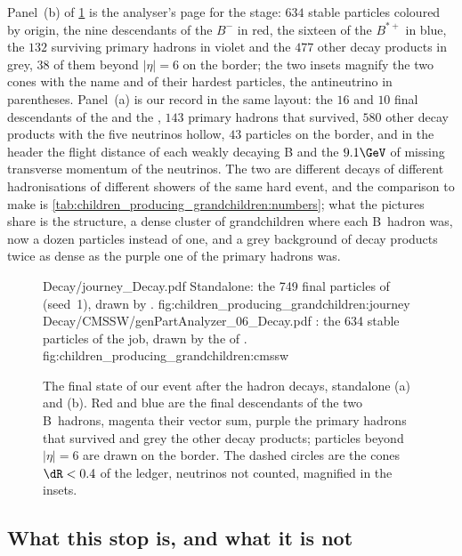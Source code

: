Panel~(b) of \cref{fig:children_producing_grandchildren:displays} is the
analyser's page for the stage: $634$ stable particles coloured by origin,
the nine descendants of the $B^-$ in red, the sixteen of the $B^{*+}$ in
blue, the $132$ surviving primary hadrons in violet and the $477$ other
decay products in grey, $38$ of them beyond $|\eta|=6$ on the border; the
two insets magnify the two cones with the name and \pt of their hardest
particles, the antineutrino in parentheses. Panel~(a) is our record in
the same layout: the $16$ and $10$ final descendants of the \Bstarbar and
the \Bstar, $143$ primary hadrons that survived, $580$ other decay
products with the five neutrinos hollow, $43$ particles on the border,
and in the header the flight distance of each weakly decaying B and the
$9.1\GeV$ of missing transverse momentum of the neutrinos. The two are
different decays of different hadronisations of different showers of the
same hard event, and the comparison to make is
\cref{tab:children_producing_grandchildren:numbers}; what the pictures
share is the structure, a dense cluster of grandchildren where each
B~hadron was, now a dozen particles instead of one, and a grey background
of decay products twice as dense as the purple one of the primary hadrons
was.

\begin{figure}[p]\centering
\ledgerdisplays
  {Decay/journey_Decay.pdf}
  {Standalone: the 749 final particles of  (seed~1), drawn by .}
  {fig:children_producing_grandchildren:journey}
  {Decay/CMSSW/genPartAnalyzer_06_Decay.pdf}
  {\CMSSW: the 634 stable particles of the  job, drawn by the  of .}
  {fig:children_producing_grandchildren:cmssw}
\caption[The event after the hadron decays in the $(\eta,\phi)$ plane,
standalone and \CMSSW]{The final state of our event after the hadron
decays, standalone (a) and \CMSSW (b). Red and blue are the final
descendants of the two B~hadrons, magenta their vector sum, purple the
primary hadrons that survived and grey the other decay products;
particles beyond $|\eta|=6$ are drawn on the border. The dashed circles
are the cones $\dR<0.4$ of the ledger, neutrinos not counted, magnified in
the insets.}
\label{fig:children_producing_grandchildren:displays}
\end{figure}

\subsection{What this stop is, and what it is not}
\label{sec:children_producing_grandchildren:caveats}

